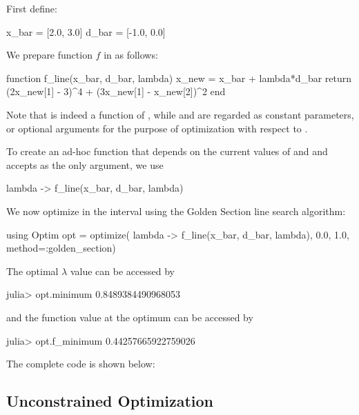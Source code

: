 First define:
\begin{code}
x_bar = [2.0, 3.0]
d_bar = [-1.0, 0.0]
\end{code}
We prepare function $f$ in \julia{} as follows:
\begin{code}
function f_line(x_bar, d_bar, lambda)
    x_new = x_bar + lambda*d_bar
    return (2x_new[1] - 3)^4 + (3x_new[1] - x_new[2])^2
end
\end{code}
\noindent Note that  is indeed a function of , while  and  are regarded as constant parameters, or optional arguments for the purpose of optimization with respect to . 

To create an ad-hoc function that depends on the current values of  and  and accepts  as the only argument, we use 
\begin{code}
lambda -> f_line(x_bar, d_bar, lambda)
\end{code}
\noindent We now optimize  in the interval \kode{[0.0, 1.0]} using the Golden Section line search algorithm:
\begin{code}
using Optim
opt = optimize( lambda -> f_line(x_bar, d_bar, lambda), 
                           0.0, 1.0, method=:golden_section)
\end{code}

The optimal $\lambda$ value can be accessed by
\begin{code}
julia> opt.minimum
0.8489384490968053
\end{code}
\noindent and the function value at the optimum can be accessed by
\begin{code}
julia> opt.f_minimum
0.44257665922759026
\end{code}

The complete code is shown below:
\begin{codelisting}
\end{codelisting}





\subsection{Unconstrained Optimization}

